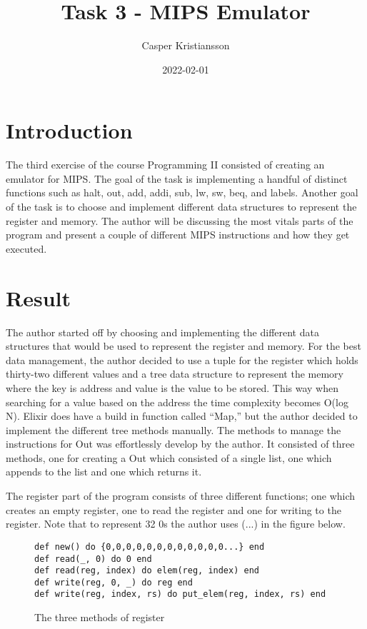 \documentclass[a4paper,11pt]{article}
\begin{document}
\title{
    \textbf{Task 3 - MIPS Emulator}
}
\author{Casper Kristiansson}
\date{2022-02-01}

\maketitle

\section*{Introduction}
The third exercise of the course Programming II consisted of creating an emulator for MIPS. The goal of the task is implementing a handful of distinct functions such as halt, out, add, addi, sub, lw, sw, beq, and labels. Another goal of the task is to choose and implement different data structures to represent the register and memory. The author will be discussing the most vitals parts of the program and present a couple of different MIPS instructions and how they get executed.

\section*{Result}
The author started off by choosing and implementing the different data structures that would be used to represent the register and memory. For the best data management, the author decided to use a tuple for the register which holds thirty-two different values and a tree data structure to represent the memory where the key is address and value is the value to be stored. This way when searching for a value based on the address the time complexity becomes O(log N). Elixir does have a build in function called “Map,” but the author decided to implement the different tree methods manually. The methods to manage the instructions for Out was effortlessly develop by the author. It consisted of three methods, one for creating a Out which consisted of a single list, one which appends to the list and one which returns it.

The register part of the program consists of three different functions; one which creates an empty register, one to read the register and one for writing to the register. Note that to represent 32 0s the author uses (...) in the figure below.

\begin{figure}[H]
\begin{verbatim}
def new() do {0,0,0,0,0,0,0,0,0,0,0,0...} end
def read(_, 0) do 0 end
def read(reg, index) do elem(reg, index) end
def write(reg, 0, _) do reg end
def write(reg, index, rs) do put_elem(reg, index, rs) end
\end{verbatim}
\caption{The three methods of register}
\label{Figure:1}
\end{figure}
\end{document}
